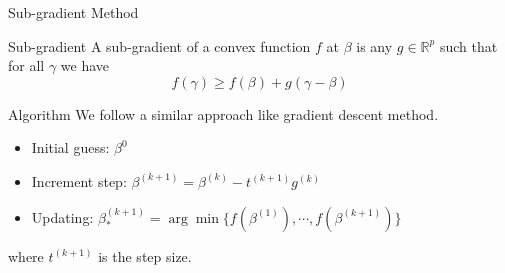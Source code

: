 \documentclass[tikz]{beamer}					%
\newcommand{\reals}{\mathbb{R}}
\begin{document}
{
\begin{frame}{Sub-gradient Method}
\begin{block}{Sub-gradient}
    A sub-gradient of a convex function $f$ at $\beta$ is any $g\in\reals^p$
    such that for all $\gamma$ we have
    \begin{equation}
        f(\gamma) \geq f(\beta) + g(\gamma-\beta)
    \end{equation}
\end{block}
\begin{block}{Algorithm}
    We follow a similar approach like gradient descent method.
    \begin{itemize}
        \item Initial guess: $\beta^{0}$
        \item Increment step: $\beta^{(k+1)} = \beta^{(k)}-t^{(k+1)}g^{(k)}$
        \item Updating: $\beta^{(k+1)}_{*} = \arg\min\{f(\beta^{(1)}),\cdots,f(\beta^{(k+1)})\}$
    \end{itemize}
    where $t^{(k+1)}$ is the step size.
\end{block}
\end{frame}
}
\end{document}
